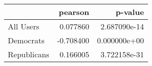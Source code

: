 \begin{tabular}{lrr}
\toprule
{} &   pearson &       p-value \\
\midrule
All Users &  0.077860 &  2.687090e-14 \\
Democrats & -0.708400 &  0.000000e+00 \\
Republicans &  0.166005 &  3.722158e-31 \\
\bottomrule
\end{tabular}
